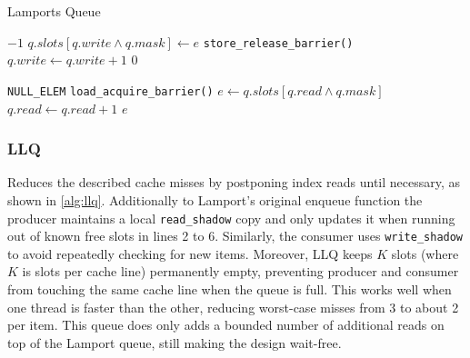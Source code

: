 \begin{algorithm}[!ht]
    \centering
    \captionsetup{justification=centering}
    \caption{Lamports Queue \cite{MaffioneCacheAware}}
    \label{alg:lamport-queue}
    \scriptsize
    \begin{algorithmic}[1]
             
                \State \Return $-1$ 
            \EndIf
            \State $q.slots[q.write \land q.mask] \gets e$
            \State \texttt{store\_release\_barrier()}
            \State $q.write \gets q.write + 1$
            \State \Return $0$
        \EndFunction
        
        \State
        
             
                \State \Return \texttt{NULL\_ELEM} 
            \EndIf
            \State \texttt{load\_acquire\_barrier()}
            \State $e \gets q.slots[q.read \land q.mask]$
            \State $q.read \gets q.read + 1$
            \State \Return $e$
        \EndFunction
    \end{algorithmic}
    \cite{MaffioneCacheAware}
\end{algorithm}

\subsubsection{\acf{LLQ}}
Reduces the described cache misses by postponing index reads until necessary, as shown in \cref{alg:llq}. Additionally to Lamport's original enqueue function the producer maintains a local \texttt{read\_shadow} copy and only updates it when running out of known free slots in lines 2 to 6. Similarly, the consumer uses \texttt{write\_shadow} to avoid repeatedly checking for new items. Moreover, \ac{LLQ} keeps $K$ slots (where $K$ is slots per cache line) permanently empty, preventing producer and consumer from touching the same cache line when the queue is full. This works well when one thread is faster than the other, reducing worst-case misses from 3 to about 2 per item. This queue does only adds a bounded number of additional reads on top of the Lamport queue, still making the design wait-free. \cite{MaffioneCacheAware}

